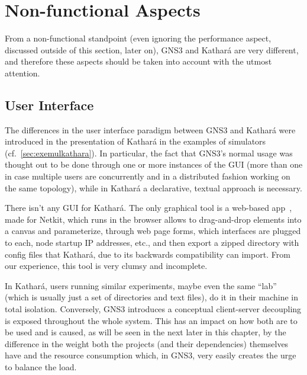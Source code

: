 \section{Non-functional Aspects}
\label{sec:comparativenonfunctional}

From a non-functional standpoint (even ignoring the performance aspect, discussed outside of this section, later on), GNS3 and Kathará are very different, and therefore these aspects should be taken into account with the utmost attention.

\subsection{User Interface}
\label{subsec:comparativeui}

The differences in the user interface paradigm between GNS3 and Kathará were introduced in the presentation of Kathará in the examples of simulators (cf.~\ref{sec:exemulkathara}).
In particular, the fact that GNS3's normal usage was thought out to be done through one or more instances of the GUI (more than one in case multiple users are concurrently and in a distributed fashion working on the same topology), while in Kathará a declarative, textual approach is necessary.

There isn't any GUI for Kathará.
The only graphical tool is a web-based app~\cite{netkitlabgen}, made for Netkit, which runs in the browser allows to drag-and-drop elements into a canvas and parameterize, through web page forms, which interfaces are plugged to each, node startup IP addresses, etc., and then export a zipped directory with config files that Kathará, due to its backwards compatibility can import.
From our experience, this tool is very clumsy and incomplete.

In Kathará, users running similar experiments, maybe even the same ``lab'' (which is usually just a set of directories and text files), do it in their machine in total isolation.
Conversely, GNS3 introduces a conceptual client-server decoupling is exposed throughout the whole system.
This has an impact on how both are to be used and is caused, as will be seen in the next later in this chapter, by the difference in the weight both the projects (and their dependencies) themselves have and the resource consumption which, in GNS3, very easily creates the urge to balance the load.



